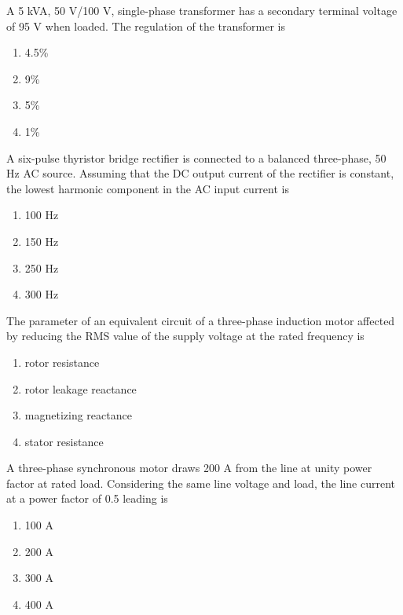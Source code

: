 \item A 5 kVA, 50 V/100 V, single-phase transformer has a secondary terminal voltage
of 95 V when loaded. The regulation of the transformer is
\begin{multicols}{4}
\begin{enumerate}
    \item 4.5\%
    \item 9\%
    \item 5\%
    \item 1\%
\end{enumerate}
\end{multicols}

\item A six-pulse thyristor bridge rectifier is connected to a balanced three-phase,
50 Hz AC source. Assuming that the DC output current of the rectifier is constant,
the lowest harmonic component in the AC input current is
\begin{multicols}{4}
\begin{enumerate}
    \item 100 Hz
    \item 150 Hz
    \item 250 Hz
    \item 300 Hz
\end{enumerate}
\end{multicols}

\item The parameter of an equivalent circuit of a three-phase induction motor affected
by reducing the RMS value of the supply voltage at the rated frequency is
\begin{enumerate}
    \item rotor resistance
    \item rotor leakage reactance
    \item magnetizing reactance
    \item stator resistance
\end{enumerate}

\item A three-phase synchronous motor draws 200 A from the line at unity power factor
at rated load. Considering the same line voltage and load, the line current at a power
factor of 0.5 leading is
\begin{multicols}{4}
\begin{enumerate}
    \item 100 A
    \item 200 A
    \item 300 A
    \item 400 A
\end{enumerate}
\end{multicols}

